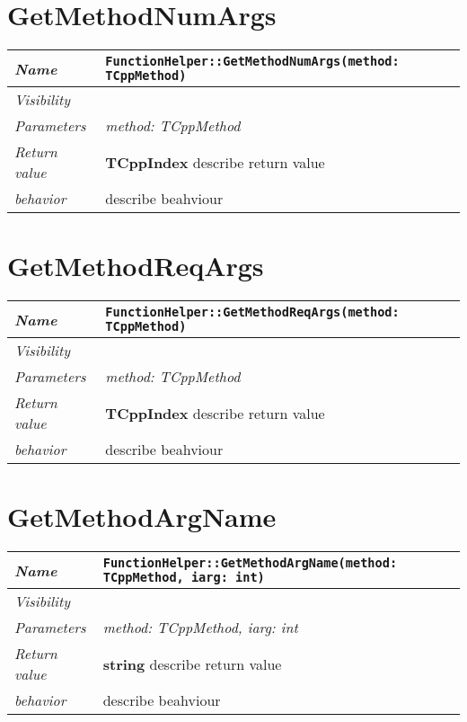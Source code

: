  \section{GetMethodNumArgs}
\begin{longtable}{p{3cm} @{\hskip 1cm} p{12cm}}
 \hline
\textit{Name} & \texttt{FunctionHelper::GetMethodNumArgs(method: TCppMethod)}\\
\hline
 \textit{Visibility} & \\
\hline
\textit{Parameters} & \textit{method: TCppMethod}\\
\hline
\textit{Return value} & \textbf{ TCppIndex} describe return value\\
  \hline
 \textit{behavior} & describe beahviour \\
\hline
\end{longtable} \pagebreak
 \section{GetMethodReqArgs}
\begin{longtable}{p{3cm} @{\hskip 1cm} p{12cm}}
 \hline
\textit{Name} & \texttt{FunctionHelper::GetMethodReqArgs(method: TCppMethod)}\\
\hline
 \textit{Visibility} & \\
\hline
\textit{Parameters} & \textit{method: TCppMethod}\\
\hline
\textit{Return value} & \textbf{ TCppIndex} describe return value\\
  \hline
 \textit{behavior} & describe beahviour \\
\hline
\end{longtable} \pagebreak
 \section{GetMethodArgName}
\begin{longtable}{p{3cm} @{\hskip 1cm} p{12cm}}
 \hline
\textit{Name} & \texttt{FunctionHelper::GetMethodArgName(method: TCppMethod, iarg: int)}\\
\hline
 \textit{Visibility} & \\
\hline
\textit{Parameters} & \textit{method: TCppMethod, iarg: int}\\
\hline
\textit{Return value} & \textbf{ string} describe return value\\
  \hline
 \textit{behavior} & describe beahviour \\
\hline
\end{longtable} \pagebreak

